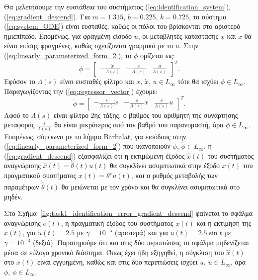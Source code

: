\documentclass[a4paper,12pt]{article}
\begin{document}
Θα μελετήσουμε την ευστάθεια του συστήματος (\ref{eq:identification_system}), (\ref{eq:gradient_descend}).
Για $m = 1.315$, $b = 0.225$, $k = 0.725$, το σύστημα (\ref{eq:system_ODE}) είναι ευσταθές, καθώς
οι πόλοι του βρίσκονται στο αριστερό ημιεπίπεδο. Επομένως, για φραγμένη είσοδο $u$, οι μεταβλητές κατάστασης
$x$ και $\dot{x}$ θα είναι επίσης φραγμένες, καθώς σχετίζονται γραμμικά με το $u$. Στην
(\ref{eq:linearly_parameterized_form_2}), το $\phi$ ορίζεται ως:
\begin{equation}
\phi = 
    \begin{bmatrix}
        -\frac{\dot{x}}{\Lambda(s)} & -\frac{x}{\Lambda(s)} & \frac{u}{\Lambda(s)}
    \end{bmatrix}^T. 
    \label{eq:regressor_vector}
\end{equation}
Εφόσον το $\Lambda(s)$ είναι ευσταθές φίλτρο και $x, \, \dot{x}, \, u \in L_{\infty}$ τότε θα ισχύει
$\phi \in L_{\infty}$. Παραγωγίζοντας την (\ref{eq:regressor_vector}) έχουμε:
\begin{equation}
\dot{\phi} = 
    \begin{bmatrix}
        -\frac{s}{\Lambda(s)}\dot{x} & -\frac{s}{\Lambda(s)}x & \frac{s}{\Lambda(s)}u
    \end{bmatrix}^T. 
    \label{eq:regressor_vector_derivative}
\end{equation}
Αφού το $\Lambda(s)$ είναι φίλτρο 2ης τάξης, ο βαθμός του αριθμητή της συνάρτησης μεταφοράς 
$\frac{s}{\Lambda(s)}$ θα είναι μικρότερος από τον βαθμό του παρανομαστή, άρα $\dot{\phi} \in L_{\infty}$.
Επομένως, σύμφωνα με το λήμμα Barbalat, για εισόδους στην
(\ref{eq:linearly_parameterized_form_2}) που ικανοποιούν $\phi, \, \dot{\phi} \in L_{\infty}$, η 
(\ref{eq:gradient_descend}) εξασφαλίζει ότι η εκτιμώμενη έξοδος $\hat{x}(t)$ του συστήματος αναγνώρισης
$\hat{x}(t) = \hat{\theta}(t) u(t)$ θα συγκλίνει ασυμπτωτικά στην έξοδο $x(t)$ του πραγματικού συστήματος 
$x(t) = \theta^{\star}u(t)$, και ο ρυθμός μεταβολής των παραμέτρων $\dot{\hat{\theta}}(t)$ θα μειώνεται με τον
χρόνο και θα συγκλίνει ασυμπτωτικά στο μηδέν.

Στο Σχήμα~\ref{fig:task1_identification_error_gradient_descend} φαίνεται το σφάλμα αναγνώρισης $e(t)$, η 
πραγματική έξοδος του συστήματος $x(t)$ και η εκτίμησή της $\hat{x}(t)$, για $u(t) = 2.5$ με 
$\gamma = 10^{-5}$ (αριστερά) και για $u(t) = 2.5 \sin t$ με $\gamma = 10^{-3}$ (δεξιά). Παρατηρούμε ότι και 
στις δύο περιπτώσεις το σφάλμα μηδενίζεται μέσα σε εύλογο χρονικό διάστημα. Όπως έχει ήδη εξηγηθεί, η σύγκλιση
του $\hat{x}(t)$ στο $x(t)$ είναι εγγυημένη, καθώς και στις δύο περιπτώσεις ισχύει 
$u, \, \dot{u} \in L_{\infty}$, άρα $\phi, \, \dot{\phi} \in L_{\infty}$.
\end{document}
